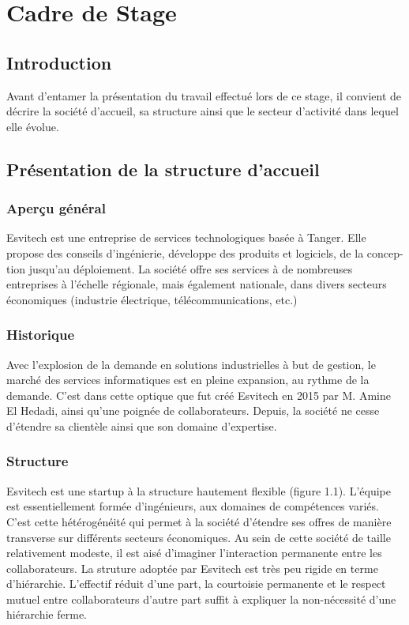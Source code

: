 \documentclass[11pt]{report}
\begin{document}
\chapter{Cadre de Stage}
\section*{Introduction}
Avant d'entamer la présentation du travail effectué lors de ce stage, il convient
de décrire la société d'accueil, sa structure ainsi que le secteur d'activité dans lequel
elle évolue.
\section{Présentation de la structure d'accueil}
\subsection{Aperçu général}
Esvitech est une entreprise de services technologiques basée à Tanger. Elle
propose des conseils d'ingénierie, développe des produits et logiciels, de la concep-
tion jusqu'au déploiement. La société offre ses services à de nombreuses entreprises
à l'échelle régionale, mais également nationale, dans divers secteurs économiques
(industrie électrique, télécommunications, etc.)

\subsection{Historique}
Avec l'explosion de la demande en solutions industrielles à but de gestion, le
marché des services informatiques est en pleine expansion, au rythme de la demande.
C'est dans cette optique que fut créé Esvitech en 2015 par M. Amine El Hedadi, ainsi
qu'une poignée de collaborateurs. Depuis, la société ne cesse d'étendre sa clientèle
ainsi que son domaine d'expertise.

\subsection{Structure}
Esvitech est une startup à la structure hautement flexible (figure 1.1). L'équipe
est essentiellement formée d'ingénieurs, aux domaines de compétences variés. C'est
cette hétérogénéité qui permet à la société d'étendre ses offres de manière transverse
sur différents secteurs économiques.
Au sein de cette société de taille relativement modeste, il est aisé d'imaginer
l'interaction permanente entre les collaborateurs. La struture adoptée par Esvitech
est très peu rigide en terme d'hiérarchie. L'effectif réduit d'une part, la courtoisie
permanente et le respect mutuel entre collaborateurs d'autre part suffit à expliquer
la non-nécessité d'une hiérarchie ferme.
\end{document}
